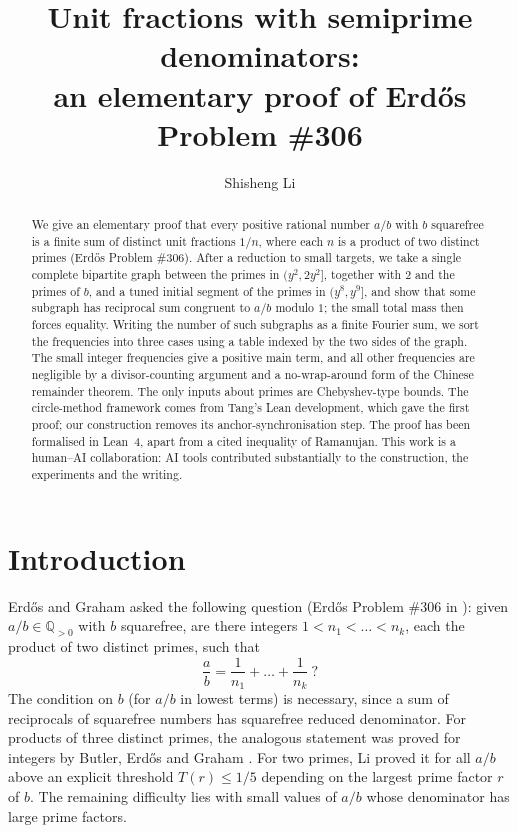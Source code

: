 \documentclass[11pt]{amsart}
\title[Unit fractions with semiprime denominators]{Unit fractions with semiprime denominators:\\ an elementary proof of Erd\H{o}s Problem \#306}
\author{Shisheng Li}
\theoremstyle{definition}
\theoremstyle{remark}
\newcommand{\Q}{\mathbb{Q}}
\begin{document}
\begin{abstract}
We give an elementary proof that every positive rational number $a/b$ with $b$ squarefree is a finite sum of distinct unit fractions $1/n$, where each $n$ is a product of two distinct primes (Erd\H{o}s Problem \#306). After a reduction to small targets, we take a single complete bipartite graph between the primes in $(y^2,2y^2]$, together with $2$ and the primes of $b$, and a tuned initial segment of the primes in $(y^8,y^9]$, and show that some subgraph has reciprocal sum congruent to $a/b$ modulo $1$; the small total mass then forces equality. Writing the number of such subgraphs as a finite Fourier sum, we sort the frequencies into three cases using a table indexed by the two sides of the graph. The small integer frequencies give a positive main term, and all other frequencies are negligible by a divisor-counting argument and a no-wrap-around form of the Chinese remainder theorem. The only inputs about primes are Chebyshev-type bounds. The circle-method framework comes from Tang's Lean development, which gave the first proof; our construction removes its anchor-synchronisation step. The proof has been formalised in Lean~4, apart from a cited inequality of Ramanujan. This work is a human--AI collaboration: AI tools contributed substantially to the construction, the experiments and the writing.
\end{abstract}

\maketitle

\section{Introduction}

Erd\H{o}s and Graham \cite{ErGr80} asked the following question (Erd\H{o}s Problem \#306 in \cite{Bloom}): given $a/b\in\Q_{>0}$ with $b$ squarefree, are there integers $1<n_1<\dots<n_k$, each the product of two distinct primes, such that
\[
  \frac ab=\frac1{n_1}+\dots+\frac1{n_k}\ ?
\]
The condition on $b$ (for $a/b$ in lowest terms) is necessary, since a sum of reciprocals of squarefree numbers has squarefree reduced denominator. For products of three distinct primes, the analogous statement was proved for integers by Butler, Erd\H{o}s and Graham \cite{BEG15}. For two primes, Li \cite{Li26} proved it for all $a/b$ above an explicit threshold $T(r)\le1/5$ depending on the largest prime factor $r$ of $b$. The remaining difficulty lies with small values of $a/b$ whose denominator has large prime factors.
\end{document}
